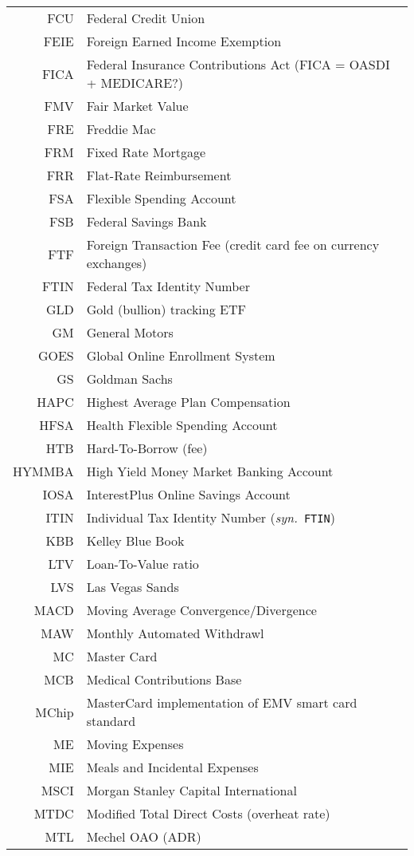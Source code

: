 \documentclass[12pt,twoside]{article}
\newcommand{\syn}[1]{(\textit{syn.}~\texttt{#1})}
\begin{document}
\begin{longtable}[>{\bfseries}l]{>{\ttfamily}r l}
FCU & Federal Credit Union \\
FEIE & Foreign Earned Income Exemption \\
FICA & Federal Insurance Contributions Act (FICA = OASDI + MEDICARE?) \\
FMV & Fair Market Value \\
FRE & Freddie Mac \\
FRM & Fixed Rate Mortgage \\
FRR & Flat-Rate Reimbursement \\
FSA & Flexible Spending Account \\
FSB & Federal Savings Bank \\
FTF & Foreign Transaction Fee (credit card fee on currency exchanges) \\
FTIN & Federal Tax Identity Number \\
GLD & Gold (bullion) tracking ETF \\
GM & General Motors \\
GOES & Global Online Enrollment System \\
GS & Goldman Sachs \\
HAPC & Highest Average Plan Compensation \\
HFSA & Health Flexible Spending Account \\
HTB & Hard-To-Borrow (fee) \\
HYMMBA & High Yield Money Market Banking Account \\
IOSA & InterestPlus Online Savings Account \\
ITIN & Individual Tax Identity Number \syn{FTIN} \\
KBB & Kelley Blue Book \\
LTV & Loan-To-Value ratio \\
LVS & Las Vegas Sands \\
MACD & Moving Average Convergence/Divergence \\
MAW & Monthly Automated Withdrawl \\
MC & Master Card \\
MCB & Medical Contributions Base \\
MChip & MasterCard implementation of EMV smart card standard \\
ME & Moving Expenses \\
MIE & Meals and Incidental Expenses \\
MSCI & Morgan Stanley Capital International \\
MTDC & Modified Total Direct Costs (overheat rate) \\
MTL & Mechel OAO (ADR) \\

\end{longtable}
\end{document}
